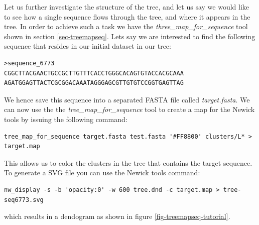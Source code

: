 Let us further investigate the structure of the tree, and let us say
we would like to see how a single sequence flows through the tree,
and where it appears in the tree. In order to achieve such a task we
have the \emph{three\_map\_for\_sequence} tool shown in section
\ref{sec-treemapseq}. Lets say we are interested to find the following
sequence that resides in our initial dataset in our tree:
\begin{lstlisting}
>sequence_6773
CGGCTTACGAACTGCCGCTTGTTTCACCTGGGCACAGTGTACCACGCAAA
AGATGGAGTTACTCGCGGACAAATAGGGAGCGTTGTGTCCGGTGAGTTAG
\end{lstlisting}
We hence save this sequence into a separated FASTA file called
\emph{target.fasta}.
We can now use the the \emph{tree\_map\_for\_sequence} tool to create
a map for the Newick tools by issuing the following command:
\begin{lstlisting}
tree_map_for_sequence target.fasta test.fasta '#FF8800' clusters/L* > target.map
\end{lstlisting}
This allows us to color the clusters in the tree that contains the
target sequence. To generate a SVG file you can use the Newick tools
command:
\begin{lstlisting}
nw_display -s -b 'opacity:0' -w 600 tree.dnd -c target.map > tree-seq6773.svg
\end{lstlisting}
which results in a dendogram as shown in figure \ref{fig-treemapseq-tutorial}.
